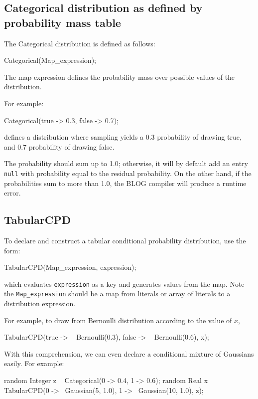 \documentclass[12pt]{article}
\begin{document}
\subsection{Categorical distribution as defined by probability mass table}

The Categorical distribution is defined as follows:
\begin{blogcode}
Categorical(Map_expression);
\end{blogcode}
The map expression defines the probability mass over possible values of the distribution.

For example:
\begin{blogcode}
Categorical({true -> 0.3, false -> 0.7});
\end{blogcode}
defines a distribution where sampling yields a 0.3 probability of drawing true, and 0.7 probability of drawing false.

The probability should sum up to 1.0; otherwise, it will by default add an entry \texttt{null} with probability
equal to the residual probability.  On the other hand, if the probabilities sum to more than 1.0, the BLOG
compiler will produce a runtime error.


\subsection{TabularCPD}
To declare and construct a tabular conditional probability distribution, use the form:
\begin{blogcode}
TabularCPD(Map_expression, expression);
\end{blogcode}
which evaluates \verb|expression| as a key and generates values from the map. Note the \verb|Map_expression| should be a map from literals or array of literals to a distribution expression. 

For example, to draw from Bernoulli distribution according to the value of $x$, 
\begin{blogcode}
TabularCPD({true -> ~ Bernoulli(0.3), 
            false -> ~ Bernoulli(0.6)}, x);
\end{blogcode}

With this comprehension, we can even declare a conditional mixture of Gaussians easily. For example:
\begin{blogcode}
random Integer z ~ Categorical({0 -> 0.4, 1 -> 0.6});
random Real x ~ TabularCPD({0 -> ~Gaussian(5, 1.0), 
                 1 -> ~Gaussian(10, 1.0)}, z);
\end{blogcode}
\end{document}
